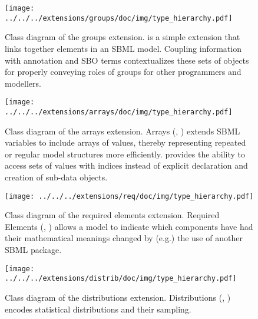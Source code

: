 \begin{figure}[hb]
 \centering
 \vspace*{2ex}
 \texttt{[image: ../../../extensions/groups/doc/img/type\_hierarchy.pdf]}
 \caption[Class diagram of the groups extension]{Class diagram of the groups extension.  is a simple extension that links together elements in an SBML model. Coupling
 information with annotation and SBO terms \cite{Courtot2011a} 
contextualizes these sets of objects for properly conveying roles of groups 
for other programmers and modellers.}
 \label{fig:groups}
\end{figure}


\begin{figure}[hb]
 \centering
 \vspace*{2ex}
 \texttt{[image: ../../../extensions/arrays/doc/img/type\_hierarchy.pdf]}
 \caption[Class diagram of the arrays extension]{Class diagram of the arrays extension. Arrays (, \cite{Watanabe2013}) extends SBML variables to include arrays of values,
thereby representing repeated or regular model structures more efficiently.
 provides the ability to access sets of values with indices instead of explicit
declaration and creation of sub-data objects.}
 \label{fig:arrays}
\end{figure}


\begin{figure}[hb]
 \centering
 \vspace*{2ex}
 \texttt{[image: ../../../extensions/req/doc/img/type\_hierarchy.pdf]}
 \caption[Class diagram of the required elements extension]{Class diagram of the required elements extension. Required Elements (, \cite{Smith2013}) allows a model to indicate which
components have had their mathematical meanings changed by (e.g.) the use of
another SBML package.}
 \label{fig:arrays}
\end{figure}


\begin{figure}[hb]
 \centering
 \vspace*{2ex}
 \texttt{[image: ../../../extensions/distrib/doc/img/type\_hierarchy.pdf]}
 \caption[Class diagram of the distributions extension.]{ Class diagram of the distributions extension. Distributions 
 (, \cite{Moodie2013}) encodes statistical distributions and their sampling.}
 \label{fig:distrib}
\end{figure}

